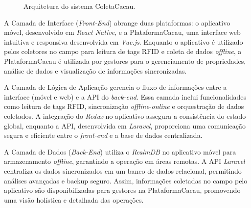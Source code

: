 \begin{figure}[H]
    \centering
    \caption{Arquitetura do sistema ColetaCacau.}
    \label{fig:C4Diagram}
\end{figure}

A Camada de Interface (\textit{Front-End}) abrange duas plataformas: o aplicativo móvel, desenvolvido em \textit{React Native}, e a PlataformaCacau, uma interface web intuitiva e responsiva desenvolvida em \textit{Vue.js}. Enquanto o aplicativo é utilizado pelos coletores no campo para leitura de tags RFID e coleta de dados \textit{offline}, a PlataformaCacau é utilizada por gestores para o gerenciamento de propriedades, análise de dados e visualização de informações sincronizadas.

A Camada de Lógica de Aplicação gerencia o fluxo de informações entre a interface (móvel e web) e a API do \textit{back-end}. Essa camada inclui funcionalidades como leitura de tags RFID, sincronização \textit{offline}-\textit{online} e orquestração de dados coletados. A integração do \textit{Redux} no aplicativo assegura a consistência do estado global, enquanto a API, desenvolvida em \textit{Laravel}, proporciona uma comunicação segura e eficiente entre o \textit{front-end} e a base de dados centralizada.

A Camada de Dados (\textit{Back-End}) utiliza o \textit{RealmDB} no aplicativo móvel para armazenamento \textit{offline}, garantindo a operação em áreas remotas. A API \textit{Laravel} centraliza os dados sincronizados em um banco de dados relacional, permitindo análises avançadas e backup seguro. Assim, informações coletadas no campo pelo aplicativo são disponibilizadas para gestores na PlataformaCacau, promovendo uma visão holística e detalhada das operações.

